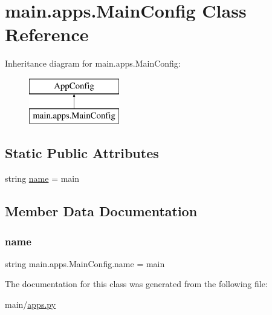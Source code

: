 \hypertarget{classmain_1_1apps_1_1MainConfig}{}\section{main.\+apps.\+Main\+Config Class Reference}
\label{classmain_1_1apps_1_1MainConfig}
Inheritance diagram for main.\+apps.\+Main\+Config\+:\begin{figure}[H]
\begin{center}
\leavevmode
\includegraphics[height=2.000000cm]{classmain_1_1apps_1_1MainConfig}
\end{center}
\end{figure}
\subsection*{Static Public Attributes}
\begin{DoxyCompactItemize}
\item 
string \hyperlink{classmain_1_1apps_1_1MainConfig_aa4f22f649b0536d455304a3d137d6b2c}{name} = \textquotesingle{}main\textquotesingle{}
\end{DoxyCompactItemize}


\subsection{Member Data Documentation}
\mbox{\label{classmain_1_1apps_1_1MainConfig_aa4f22f649b0536d455304a3d137d6b2c}} 
\subsubsection{\texorpdfstring{name}{name}}
{\footnotesize\ttfamily string main.\+apps.\+Main\+Config.\+name = \textquotesingle{}main\textquotesingle{}\hspace{0.3cm}{\ttfamily [static]}}



The documentation for this class was generated from the following file\+:\begin{DoxyCompactItemize}
\item 
main/\hyperlink{apps_8py}{apps.\+py}\end{DoxyCompactItemize}
